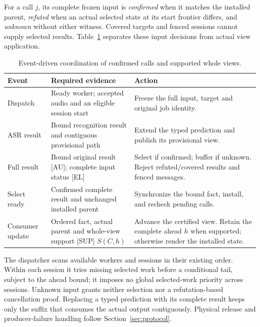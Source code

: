For a call $j$, its complete frozen input is \emph{confirmed} when it
matches the installed parent, \emph{refuted} when an actual selected state
at its start frontier differs, and \emph{unknown} without either witness.
Covered targets and fenced sessions cannot supply selected results.
Table~\ref{tab:coordinator} separates these input decisions from actual
view application.

\begin{table}[t]
\centering
\caption{Event-driven coordination of confirmed calls and supported
whole views.}
\label{tab:coordinator}
\begingroup\small
\setlength{\tabcolsep}{3pt}
\begin{tabular}{@{}>{\raggedright\arraybackslash}p{}>{\raggedright\arraybackslash}p{}>{\raggedright\arraybackslash}p{}@{}}
\toprule
Event & Required evidence & Action\\
\midrule
Dispatch & Ready worker; accepted audio and an eligible session start &
Freeze the full input, target and original job identity.\\
ASR result & Bound recognition result and contiguous provisional path &
Extend the typed prediction and publish its provisional view.\\
Full result & Bound original result [AU]; complete input status [EL] &
Select if confirmed; buffer if unknown. Reject refuted/covered results and
fenced messages.\\
Select ready & Confirmed complete result and unchanged installed parent &
Synchronize the bound fact, install, and recheck pending calls.\\
Consumer update & Ordered fact, actual parent and whole-view support [SUP]
$S(C,h)$ & Advance the certified view. Retain the complete ahead $h$ when
supported; otherwise render the installed state.\\
\bottomrule
\end{tabular}
\endgroup
\end{table}

The dispatcher scans available workers and sessions in their existing
order. Within each session it tries missing selected work before a
conditional tail, subject to the ahead bound; it imposes no global
selected-work priority across sessions. Unknown input grants neither
selection nor a refutation-based cancellation proof. Replacing a typed
prediction with its complete result keeps only the suffix that consumes
the actual output contiguously. Physical release and producer-failure
handling follow Section~\ref{sec:protocol}.

